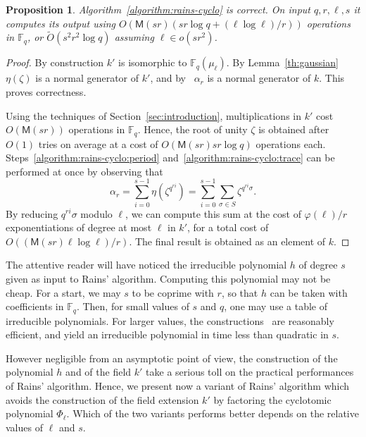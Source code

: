\documentclass[12pt]{article}
\theoremstyle{plain}
\newtheorem{proposition}[theorem]{Proposition}
\theoremstyle{definition}
\newcommand{\tildO}{\tilde{O}}
\def\F{\ensuremath{\mathbb{F}}}
\def\MM{\ensuremath{\mathsf{M}}}
\def\euler{\ensuremath{\varphi}}
\newcounter{algorithm}
\begin{document}
\begin{proposition}
  Algorithm~\ref{algorithm:rains-cyclo} is correct. On input
  $q,r,\ell,s$ it computes its output using
  $O(\MM(sr)(sr\log q + (\ell\log\ell)/r))$ operations in $\F_q$, or
  $\tildO(s^2r^2\log q)$ assuming $\ell\in o(sr^2)$.
\end{proposition}
\begin{proof}
  By construction $k'$ is isomorphic to $\F_q(\mu_\ell)$. By
  Lemma~\ref{th:gaussian} $\eta(\zeta)$ is a normal generator of $k'$,
  and by~\cite[Prop.~5.2.3.1]{mullen2013handbook} $\alpha_r$ is a
  normal generator of $k$. This proves correctness.

  Using the techniques of Section~\ref{sec:introduction},
  multiplications in $k'$ cost $O(\MM(sr))$ operations in $\F_q$.
  Hence, the root of unity $\zeta$ is obtained after $O(1)$ tries on
  average at a cost of $O(\MM(sr)sr\log q)$ operations each.
  Steps~\ref{algorithm:rains-cyclo:period}
  and~\ref{algorithm:rains-cyclo:trace} can be performed at once by
  observing that
  \[\alpha_r = \sum_{i=0}^{s-1}\eta(\zeta^{q^{ri}})= \sum_{i=0}^{s-1}\sum_{\sigma\in S}\zeta^{q^{ri}\sigma}.\]
  By reducing $q^{ri}\sigma$ modulo $\ell$, we can compute this sum at
  the cost of $\euler(\ell)/r$ exponentiations of degree at most
  $\ell$ in $k'$, for a total cost of
  $O((\MM(sr)\ell\log\ell)/r)$. The final result is obtained as an
  element of $k$.
\end{proof}

The attentive reader will have noticed the irreducible polynomial $h$
of degree $s$ given as input to Rains' algorithm. Computing this
polynomial may not be cheap. For a start, we may $s$ to be coprime
with $r$, so that $h$ can be taken with coefficients in $\F_q$. Then,
for small values of $s$ and $q$, one may use a table of irreducible
polynomials. For larger values, the
constructions~\cite{couveignes+lercier11,DeDoSc13,DeFeo:2014:FAA:2608628.2608672}
are reasonably efficient, and yield an irreducible polynomial in time
less than quadratic in $s$.

However negligible from an asymptotic point of view, the construction
of the polynomial $h$ and of the field $k'$ take a serious toll on the
practical performances of Rains' algorithm. Hence, we present now a
variant of Rains' algorithm which avoids the construction of the field
extension $k'$ by factoring the cyclotomic polynomial
$\Phi_\ell$. Which of the two variants performs better depends on the
relative values of $\ell$ and $s$.
\end{document}
